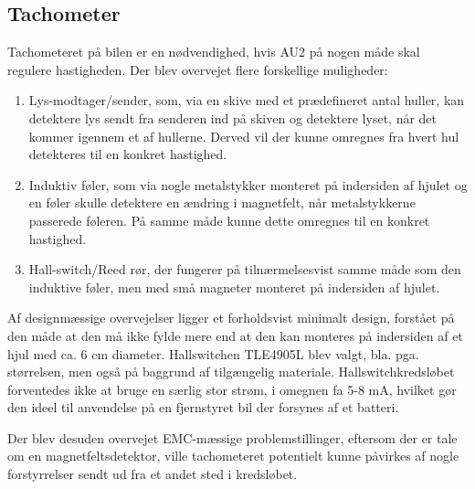 \subsection{Tachometer}

Tachometeret på bilen er en nødvendighed, hvis AU2 på nogen måde skal regulere hastigheden. Der blev overvejet flere forskellige muligheder:
\begin{enumerate}
	\item Lys-modtager/sender, som, via en skive med et prædefineret antal huller, kan detektere lys sendt fra senderen ind på skiven og detektere lyset, når det kommer igennem et af hullerne. Derved vil der kunne omregnes fra hvert hul detekteres til en konkret hastighed.
	\item Induktiv føler, som via nogle metalstykker monteret på indersiden af hjulet og en føler skulle detektere en ændring i magnetfelt, når metalstykkerne passerede føleren. På samme måde kunne dette omregnes til en konkret hastighed.
	\item Hall-switch/Reed rør, der fungerer på tilnærmelsesvist samme måde som den induktive føler, men med små magneter monteret på indersiden af hjulet. 
\end{enumerate}

Af designmæssige overvejelser ligger et forholdsvist minimalt design, forstået på den måde at den må ikke fylde mere end at den kan monteres på indersiden af et hjul med ca. 6 cm diameter. Hallswitchen TLE4905L \cite{lib:tacho} blev valgt, bla. pga. størrelsen, men også på baggrund af tilgængelig materiale. Hallswitchkredsløbet forventedes ikke at bruge en særlig stor strøm, i omegnen fa 5-8 mA, hvilket gør den ideel til anvendelse på en fjernstyret bil der forsynes af et batteri. 

Der blev desuden overvejet EMC-mæssige problemstillinger, eftersom der er tale om en magnetfeltsdetektor, ville tachometeret potentielt kunne påvirkes af nogle forstyrrelser sendt ud fra et andet sted i kredsløbet.